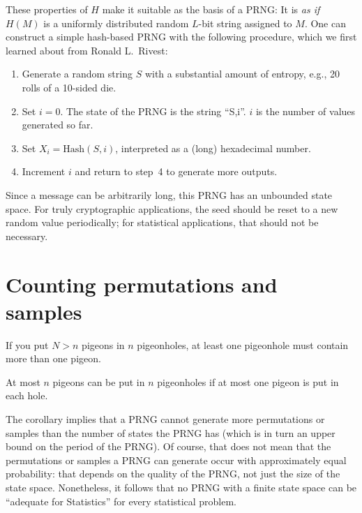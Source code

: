 \documentclass[graybox]{svmult}
\begin{document}
These properties of $H$ make it suitable as the basis of a PRNG:
It is \emph{as if} $H(M)$ is a uniformly distributed random $L$-bit string assigned to $M$.
One can construct a simple hash-based PRNG with the following procedure, which we first learned about
from Ronald L.~Rivest:

\begin{enumerate}
\item Generate a random string $S$ with a substantial amount of entropy, e.g., 20 rolls of a
10-sided die.
\item Set $i=0$. The state of the PRNG is the string ``S,i''. $i$ is the number of values generated so far. 
\item Set $X_i = {\mbox{Hash}}(S,i)$, interpreted as a (long) hexadecimal number.
\item Increment $i$ and return to step~4 to generate more outputs.
\end{enumerate}

\noindent Since a message can be arbitrarily long, this PRNG has an unbounded state space. For truly cryptographic applications, the seed should be reset to a new random value periodically; for statistical applications, that should not be necessary.

\section{Counting permutations and samples}
\label{sec:count}

\begin{theorem}
If you put $N>n$ pigeons in $n$ pigeonholes, at least one
pigeonhole must contain more than one pigeon.
\end{theorem}

\begin{corollary}
At most $n$ pigeons can be put in $n$ pigeonholes if at most
one pigeon is put in each hole.
\end{corollary}

The corollary implies that a PRNG cannot generate more permutations or samples than the number of states the PRNG has (which is in turn an upper bound on the period of the PRNG).
Of course, that does not mean that the permutations or samples a PRNG can generate occur with approximately equal probability: that depends on the quality of the PRNG, not just the size of the state space. 
Nonetheless, it follows that no PRNG with a finite state space can be ``adequate for Statistics'' for every statistical problem.
\end{document}
